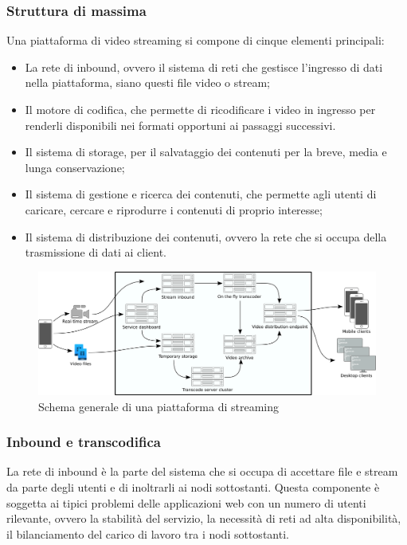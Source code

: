 		\subsubsection{Struttura di massima}
			Una piattaforma di video streaming si compone di cinque elementi principali:
			\begin{itemize}
			\item La rete di inbound, ovvero il sistema di reti che gestisce l'ingresso di dati nella piattaforma, siano questi file video o stream;
			\item Il motore di codifica, che permette di ricodificare i video in ingresso per renderli disponibili nei formati opportuni ai passaggi successivi.
			\item Il sistema di storage, per il salvataggio dei contenuti per la breve, media e lunga conservazione;
			\item Il sistema di gestione e ricerca dei contenuti, che permette agli utenti di caricare, cercare e riprodurre i contenuti di proprio interesse;
			\item Il sistema di distribuzione dei contenuti, ovvero la rete che si occupa della trasmissione di dati ai client.
			\end{itemize}

			\begin{figure}[H]
				\begin{center}
					\includegraphics[width=16.5cm,keepaspectratio]{immagini/schema-architettura-piattaforma-streaming}
					\caption{Schema generale di una piattaforma di streaming}
				\end{center}
			\end{figure}

		\subsubsection{Inbound e transcodifica}
			La rete di inbound è la parte del sistema che si occupa di accettare file e stream da parte degli utenti e di inoltrarli ai nodi sottostanti. Questa componente è soggetta ai tipici problemi delle applicazioni web con un numero di utenti rilevante, ovvero la stabilità del servizio, la necessità di reti ad alta disponibilità, il bilanciamento del carico di lavoro tra i nodi sottostanti.
